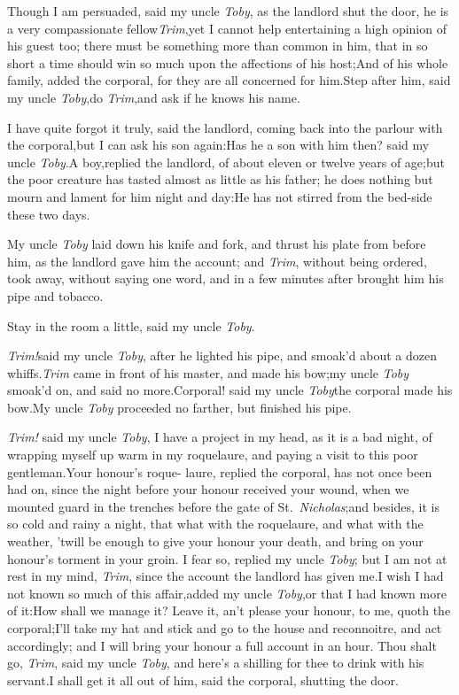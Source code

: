 \documentclass{article}
\begin{document}
Though I am persuaded, said my uncle \textit{Toby}, as the
landlord shut the door, he is a very compassionate
fellow\tsk \textit{Trim},\break\tsk yet I cannot help entertaining a high opinion
of his guest too; there must be something more than common in him,
that in so short a time should win so much upon the affections of
his host;\tsh And of his whole family, added the corporal,
for they are all concerned for him.\tsh Step after him,
said my uncle \textit{Toby},\tsk do \textit{Trim},\tsk and ask if
he knows his name.

\tsh I have quite forgot it truly, said the landlord,
coming back into the parlour with the corporal,\tsk but I can ask
his son again:\tsh Has he a son with him then? said my
uncle \textit{Toby}.\tsk A boy,\break replied the landlord, of about
eleven or twelve years of age;\tsk but the poor creature has
tasted almost as little as his father; he does nothing but mourn
and lament for him night and day:\tsh He has not stirred
from the bed-side these two days.

My uncle \textit{Toby} laid down his knife and fork, and thrust
his plate from before him, as the landlord gave him the account;
and \textit{Trim}, without being ordered, took away, without
saying one word, and in a few minutes after brought him his
pipe and tobacco.

\tsh Stay in the room a little, said my uncle
\textit{Toby}.\tsh

\textit{Trim!}\tsh said my uncle \textit{Toby}, after
he lighted his pipe, and smoak’d about a dozen
whiffs.\tsh \textit{Trim} came in front of his master, and
made his bow;\tsk my uncle \textit{Toby} smoak’d on, and said
no more.\tsh Corporal! said my uncle \textit{Toby}\break\tsh the
corporal made his bow.\tsh\break My uncle \textit{Toby} proceeded
no farther, but finished his pipe.

\textit{Trim!} said my uncle \textit{Toby}, I have a project
in my head, as it is a bad night, of wrapping myself up warm in my
roquelaure, and paying a visit to this poor
gentleman.\tsh Your honour’s roque- laure, replied the
corporal, has not once been had on, since the night before your
honour received your wound, when we mounted guard in the trenches
before the gate of St.~\textit{Nicholas};\tsk and besides, it is so
cold and rainy a night, that what with the roquelaure, and what with the
weather, ’twill be enough to give your honour your death, and
bring on your honour’s torment in your groin. I fear so,
replied my uncle \textit{Toby}; but I am not at rest in my mind,
\textit{Trim}, since the account the landlord has given
me.\tsh I wish I had not known so much of this
affair,\tsk added my uncle \textit{Toby},\tsk or that I had known
more of it:\tsh How shall we manage it? Leave it,
an’t please your honour, to me, quoth the
corporal;\tsh I’ll take my hat and stick and go to
the house and reconnoitre, and act accordingly; and I will bring
your
honour a full account in an hour.\tsh\break
Thou shalt go, \textit{Trim}, said my uncle \textit{Toby}, and
here’s a shilling for thee to drink with his servant.\tsh I
shall get it all out of him, said the corporal, shutting the
door.
\end{document}
